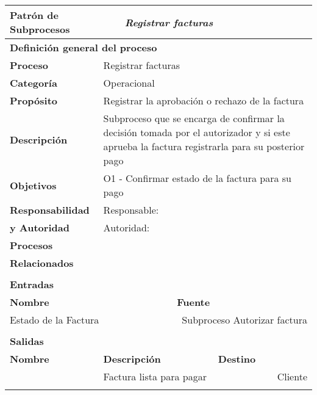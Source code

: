 \begin{longtable}{|llrrrrrr|}
	\hline
	\multicolumn{2}{|l|}{\textbf{Patrón de Subprocesos}} & \multicolumn{6}{|l|}{\textit{Registrar facturas}} \\ \hline
	\multicolumn{8}{|l|}{\textbf{Definición general del proceso}} \\ \hline
	\textbf{Proceso} & \multicolumn{7}{|m{12cm}|}{Registrar facturas} \\ \hline
	\textbf{Categoría} & \multicolumn{7}{|m{12cm}|}{Operacional} \\ \hline
	\textbf{Propósito} & \multicolumn{7}{|m{12cm}|}{Registrar la aprobación o rechazo de la factura} \\ \hline
    \textbf{Descripción} & \multicolumn{7}{|m{12cm}|}{Subproceso que se encarga de confirmar la decisión tomada por el autorizador y si este aprueba la factura registrarla para su posterior pago} \\ \hline
	\multirow{0}[6]{*}{\textbf{Objetivos}} 
          & \multicolumn{7}{|l|}{O1 -  Confirmar estado de la factura para su pago} \\ \hline
    \multicolumn{1}{|l|}{\textbf{Responsabilidad}} 	& \multicolumn{7}{|l|}{Responsable: } \\
	\multicolumn{1}{|l|}{\textbf{y Autoridad}} 	& \multicolumn{7}{|l|}{Autoridad: } \\ \hline
    \multicolumn{1}{|l|}{\textbf{Procesos}} 	& \multicolumn{7}{|m{12cm}|}{} \\
	\multicolumn{1}{|l|}{\textbf{Relacionados}} 	&  \multicolumn{7}{|m{12cm}|}{} \\ \hline
          &       &       &       &       &       &       &  \\ \hline
    \multicolumn{8}{|l|}{\textbf{Entradas}} \\ \hline
    \multicolumn{5}{|l|}{\textbf{Nombre}}   & \multicolumn{3}{|l|}{\textbf{Fuente}} \\ \hline
    \multicolumn{5}{|l|}{Estado de la Factura} & \multicolumn{3}{|m{3.5cm}|}{Subproceso Autorizar factura} \\  \hline
       &       &       &       &       &       &       &  \\ \hline
    \multicolumn{8}{|l|}{\textbf{Salidas}} \\ \hline
    \textbf{Nombre} & \multicolumn{5}{|l|}{\textbf{Descripción}} & \multicolumn{2}{|l|}{\textbf{Destino}} \\ \hline
     & \multicolumn{5}{|m{6cm}|}{Factura lista para pagar} & \multicolumn{2}{|m{3cm}|}{Cliente} \\ \hline
       &       &       &       &       &       &       &  \\ \hline
	

\end{longtable}
